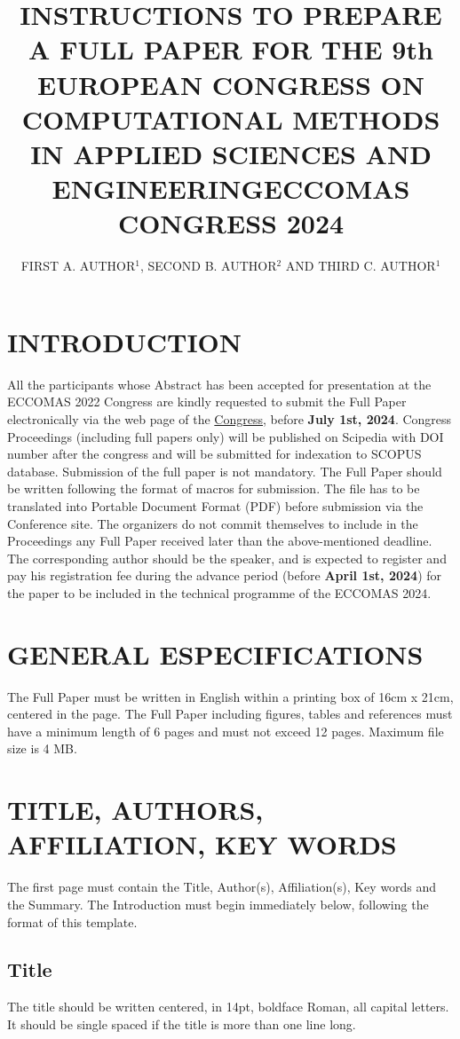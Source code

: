 \documentclass[a4paper]{eccomas_paper-2024}
\title{INSTRUCTIONS TO PREPARE A FULL PAPER FOR THE 9th EUROPEAN CONGRESS ON COMPUTATIONAL METHODS IN APPLIED SCIENCES AND ENGINEERING\break ECCOMAS CONGRESS 2024}
\author{FIRST A. AUTHOR$^1$, SECOND B. AUTHOR$^2$ AND THIRD C. AUTHOR$^1$}
\begin{document}
\thispagestyle{empty}

\section{INTRODUCTION}

All the participants whose Abstract has been accepted for presentation at the ECCOMAS 2022 Congress are kindly requested to submit the Full Paper electronically via the web page of the \href{https://eccomas2024.org/lisbon}{Congress}, before \textbf{July 1st, 2024}. Congress Proceedings (including full papers only) will be published on Scipedia with DOI number after the congress and will be submitted for indexation to SCOPUS database. Submission of the full paper is not mandatory. The Full Paper should be written following the format of macros for submission. The file has to be translated into Portable Document Format (PDF) before submission via the Conference site. The organizers do not commit themselves to include in the Proceedings any Full Paper received later than the above-mentioned deadline. The corresponding author should be the speaker, and is expected to register and pay his registration fee during the advance period (before \textbf{April 1st, 2024}) for the paper to be included in the technical programme of the ECCOMAS 2024.

\section{GENERAL ESPECIFICATIONS}

The Full Paper must be written in English within a printing box of 16cm x 21cm, centered in the page. The Full Paper including figures, tables and references must have a minimum length of 6 pages and must not exceed 12 pages. Maximum file size is 4 MB.

\section{TITLE, AUTHORS, AFFILIATION, KEY WORDS}

The first page must contain the Title, Author(s), Affiliation(s),
Key words and the Summary. The Introduction must begin immediately
below, following the format of this template.

\subsection{Title}

The title should be written centered, in 14pt, boldface Roman, all
capital letters. It should be single spaced if the title is more
than one line long.
\end{document}
